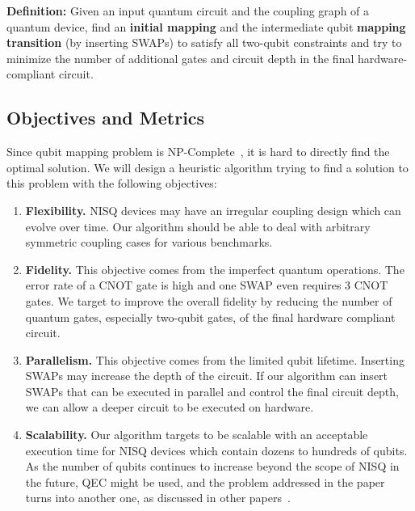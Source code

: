 \documentclass[journal,10pt,twocolumn]{IEEEtran}
\begin{document}
\textbf{Definition:} Given an input quantum circuit and the coupling graph of a quantum device, find an \textbf{initial mapping} and the intermediate qubit \textbf{mapping transition} (by inserting SWAPs) to satisfy all two-qubit constraints and try to minimize the number of additional gates and circuit depth in the final hardware-compliant circuit.


\subsection{Objectives and Metrics}\label{sec:objective}

Since qubit mapping problem is NP-Complete~\cite{siraichi2018qubit}, it is hard to directly find the optimal solution.
We will design a heuristic algorithm trying to find a solution to this problem with the following objectives:

\begin{enumerate}
\item \textbf{Flexibility.}
NISQ devices may have an irregular coupling design which can evolve over time. Our algorithm should be able to deal with arbitrary symmetric coupling cases for various benchmarks.

\item \textbf{Fidelity.} 
This objective comes from the imperfect quantum operations. 
The error rate of a CNOT gate is high and one SWAP even requires 3 CNOT gates. 
We target to improve the overall fidelity by reducing the number of quantum gates, especially two-qubit gates, of the final hardware compliant circuit.

\item \textbf{Parallelism.} 
This objective comes from the limited qubit lifetime. Inserting SWAPs may increase the depth of the circuit. 
If our algorithm can insert SWAPs that can be executed in parallel and control the final circuit depth, we can allow a deeper circuit to be executed on hardware.

\item \textbf{Scalability.}
Our algorithm targets to be scalable with an acceptable execution time for NISQ devices which contain dozens to hundreds of qubits.
As the number of qubits continues to increase beyond the scope of NISQ in the future, QEC might be used, and the problem addressed in the paper turns into another one, as discussed in other papers~\cite{heckey2015compiler,paler2017fault,javadi2017optimized,lao2018mapping}.
\end{enumerate}
\end{document}
